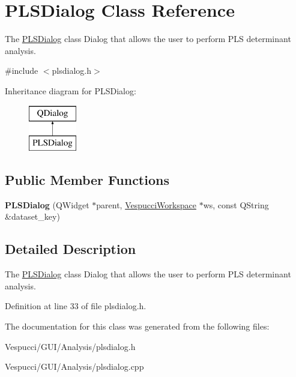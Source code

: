 \hypertarget{class_p_l_s_dialog}{}\section{P\+L\+S\+Dialog Class Reference}
\label{class_p_l_s_dialog}


The \hyperlink{class_p_l_s_dialog}{P\+L\+S\+Dialog} class Dialog that allows the user to perform P\+LS determinant analysis.  




{\ttfamily \#include $<$plsdialog.\+h$>$}

Inheritance diagram for P\+L\+S\+Dialog\+:\begin{figure}[H]
\begin{center}
\leavevmode
\includegraphics[height=2.000000cm]{class_p_l_s_dialog}
\end{center}
\end{figure}
\subsection*{Public Member Functions}
\begin{DoxyCompactItemize}
\item 
{\bfseries P\+L\+S\+Dialog} (Q\+Widget $\ast$parent, \hyperlink{class_vespucci_workspace}{Vespucci\+Workspace} $\ast$ws, const Q\+String \&dataset\+\_\+key)\hypertarget{class_p_l_s_dialog_af9a028e6ac7f414b9f521de1e9f2fcf1}{}\label{class_p_l_s_dialog_af9a028e6ac7f414b9f521de1e9f2fcf1}

\end{DoxyCompactItemize}


\subsection{Detailed Description}
The \hyperlink{class_p_l_s_dialog}{P\+L\+S\+Dialog} class Dialog that allows the user to perform P\+LS determinant analysis. 

Definition at line 33 of file plsdialog.\+h.



The documentation for this class was generated from the following files\+:\begin{DoxyCompactItemize}
\item 
Vespucci/\+G\+U\+I/\+Analysis/plsdialog.\+h\item 
Vespucci/\+G\+U\+I/\+Analysis/plsdialog.\+cpp\end{DoxyCompactItemize}
